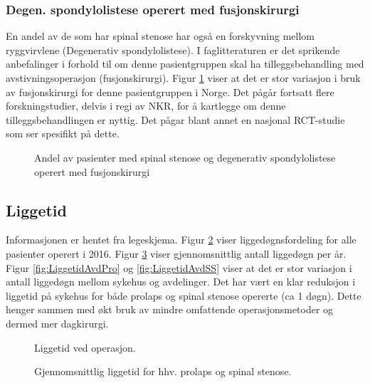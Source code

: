 \subsubsection{Degen. spondylolistese operert med fusjonskirurgi}


En andel av de som har spinal stenose har også en forskyvning mellom ryggvirvlene (Degenerativ spondylolistese). I faglitteraturen er det sprikende anbefalinger i forhold til om denne pasientgruppen skal ha tilleggsbehandling med avstivningsoperasjon (fusjonskirurgi).
Figur \ref{fig:degSponFusj} viser at det er stor variasjon i bruk av fusjonskirurgi for denne pasientgruppen i Norge. Det pågår fortsatt flere forskningstudier, delvis i regi av NKR,  for å kartlegge om  denne tilleggsbehandlingen er nyttig. Det pågar blant annet en nasjonal RCT-studie som ser spesifikt på dette. 



\begin{figure}[ht]
\caption{\label{fig:degSponFusj} Andel av pasienter med spinal stenose og degenerativ spondylolistese operert med fusjonskirurgi}
\end{figure}


\clearpage

\subsection{Liggetid}

Informasjonen er hentet fra legeskjema.
Figur \ref{fig:Liggedogn} viser liggedøgnsfordeling for alle pasienter operert i 2016. Figur \ref{fig:LiggedognTid} viser gjennomsnittlig antall liggedøgn per år.  
Figur \ref{fig:LiggetidAvdPro} og \ref{fig:LiggetidAvdSS} viser at det er stor variasjon i antall liggedøgn mellom sykehus og avdelinger.
Det har vært en klar reduksjon i  liggetid på sykehus  for både prolaps og spinal stenose opererte (ca 1 døgn). Dette henger sammen med økt bruk av mindre omfattende operasjonsmetoder og dermed mer dagkirurgi. 





\begin{figure}[h] 
\caption{Liggetid ved operasjon.}
\label{fig:Liggedogn}
\end{figure}

\begin{figure}[h] 
\centerline{
}
\caption{Gjennomsnittlig liggetid for hhv. prolaps og spinal stenose. }
\label{fig:LiggedognTid}
\end{figure}

